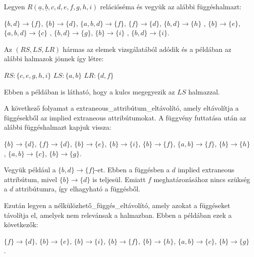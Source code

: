 \begin{pld}
Legyen $R(\underline{a},\underline{b},c,d,e,f,g,h,i)$ relációséma és vegyük az alábbi függéshalmazt:
\begin{center}
    $\{b,d\} \longrightarrow \{f\}$, 
    $\{b\} \longrightarrow \{d\}$, 
    $\{a,b,d\} \longrightarrow \{f\}$, 
    $\{f\} \longrightarrow \{d\}$, \break
    $\{b,d\} \longrightarrow \{h\}$ ,
    $\{b\} \longrightarrow \{e\}$, 
    $\{a,b,d\} \longrightarrow \{c\}$ ,
    $\{b,d\} \longrightarrow \{g\}$, \break
    $\{b\} \longrightarrow \{i\}$ ,
    $\{b,d\} \longrightarrow \{i\}$.\break
\end{center}

Az $(RS,LS,LR)$ hármas az elemek vizsgálatából adódik és a példában az alábbi halmazok jönnek így létre:

\begin{center}
    $RS: \{c,e,g,h,i\}$ \break
    $LS: \{a,b\}$\break
    $LR: \{d,f\}$
\end{center}

Ebben a példában is látható, hogy a kulcs megegyezik az $LS$ halmazzal.\par
A következő folyamat a extraneous\_attribútum\_eltávolító, amely eltávolítja a függésekből az implied extraneous attribútumokat. A függvény futtatása után az alábbi függéshalmazt kapjuk vissza:

\begin{center}
    $\{b\} \longrightarrow \{d\}$, 
    $\{f\} \longrightarrow \{d\}$, 
    $\{b\} \longrightarrow \{e\}$, 
    $\{b\} \longrightarrow \{i\}$,\break 
    $\{b\} \longrightarrow \{f\}$, 
    $\{a,b\} \longrightarrow \{f\}$, 
    $\{b\} \longrightarrow \{h\}$, 
    $\{a,b\} \longrightarrow \{c\}$, 
    $\{b\} \longrightarrow \{g\}$.
\end{center}

Vegyük például a $\{b,d\} \longrightarrow \{f\}$-et. Ebben a függésben a $d$ implied extraneous attribútum, mivel $\{b\} \longrightarrow \{d\}$ is teljesül. Emiatt $f$ meghatározásához nincs szükség a $d$ attribútumra, így elhagyható a függésből. \par

Ezután legyen a nélkülözhető\_függés\_eltávolító, amely azokat a függéseket távolítja el, amelyek nem relevánsak a halmazban. Ebben a példában ezek a következők:

\begin{center}
    $\{f\} \longrightarrow \{d\}$, 
    $\{b\} \longrightarrow \{e\}$, 
    $\{b\} \longrightarrow \{i\}$,
    $\{b\} \longrightarrow \{f\}$, \break 
    $\{b\} \longrightarrow \{h\}$, 
    $\{a,b\} \longrightarrow \{c\}$, 
    $\{b\} \longrightarrow \{g\}$.
\end{center}


\end{pld}
